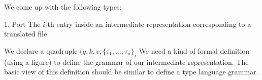 We come up with the following types:

1. Port 
The $i$-th entry inside an intermediate representation corresponding to a 
translated file 

We declare a quadruple $(g,k,v,\{\tau_1, \ldots, \tau_n\}_i$
We need a kind of formal definition (using a figure) to
define the grammar of our intermediate representation. The basic
view of this definition should be similar to define a type language
grammar.


\fi

